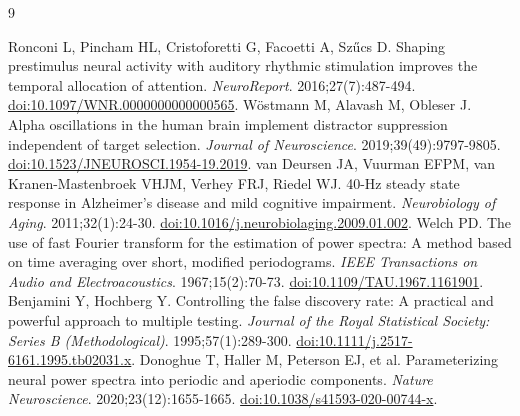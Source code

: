 \documentclass[11pt,letterpaper]{article}
\begin{document}
\begin{thebibliography}{9}
\fontsize{9.5}{11}\selectfont
\raggedright
\setlength{\itemsep}{1pt}
 Ronconi L, Pincham HL, Cristoforetti G, Facoetti A, Sz\H{u}cs D. Shaping prestimulus neural activity with auditory rhythmic stimulation improves the temporal allocation of attention. \textit{NeuroReport}. 2016;27(7):487-494. \href{https://doi.org/10.1097/WNR.0000000000000565}{doi:10.1097/WNR.0000000000000565}.
 W\"ostmann M, Alavash M, Obleser J. Alpha oscillations in the human brain implement distractor suppression independent of target selection. \textit{Journal of Neuroscience}. 2019;39(49):9797-9805. \href{https://doi.org/10.1523/JNEUROSCI.1954-19.2019}{doi:10.1523/JNEUROSCI.1954-19.2019}.
 van Deursen JA, Vuurman EFPM, van Kranen-Mastenbroek VHJM, Verhey FRJ, Riedel WJ. 40-Hz steady state response in Alzheimer's disease and mild cognitive impairment. \textit{Neurobiology of Aging}. 2011;32(1):24-30. \href{https://doi.org/10.1016/j.neurobiolaging.2009.01.002}{doi:10.1016/j.neurobiolaging.2009.01.002}.
 Welch PD. The use of fast Fourier transform for the estimation of power spectra: A method based on time averaging over short, modified periodograms. \textit{IEEE Transactions on Audio and Electroacoustics}. 1967;15(2):70-73. \href{https://doi.org/10.1109/TAU.1967.1161901}{doi:10.1109/TAU.1967.1161901}.
 Benjamini Y, Hochberg Y. Controlling the false discovery rate: A practical and powerful approach to multiple testing. \textit{Journal of the Royal Statistical Society: Series B (Methodological)}. 1995;57(1):289-300. \href{https://doi.org/10.1111/j.2517-6161.1995.tb02031.x}{doi:10.1111/j.2517-6161.1995.tb02031.x}.
 Donoghue T, Haller M, Peterson EJ, et al. Parameterizing neural power spectra into periodic and aperiodic components. \textit{Nature Neuroscience}. 2020;23(12):1655-1665. \href{https://doi.org/10.1038/s41593-020-00744-x}{doi:10.1038/s41593-020-00744-x}.
\end{thebibliography}
\end{document}
